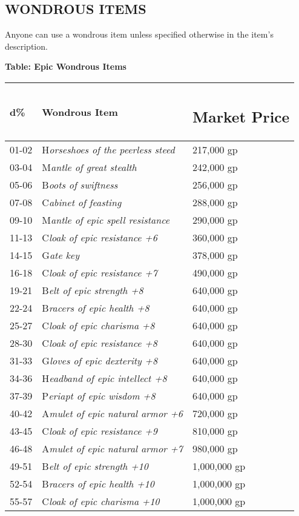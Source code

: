\documentclass{article}
\begin{document}
\vspace{12pt}
\subsection*{{\LARGE{}WONDROUS ITEMS }}

Anyone can use a wondrous item unless specified otherwise in the item's description. 

\vspace{12pt}
\textbf{Table: Epic Wondrous Items }

\begin{tabular}{|>{\raggedright}p{28pt}|>{\raggedright}p{135pt}|>{\raggedright}p{55pt}|}
\hline
d\textbf{\%} & W\textbf{ondrous Item } & \subsection*{M\textbf{arket Price }}\tabularnewline
\hline
01-02 & H\textit{orseshoes of the peerless steed } & 217,000 gp \tabularnewline
\hline
03-04 & M\textit{antle of great stealth } & 242,000 gp \tabularnewline
\hline
05-06 & B\textit{oots of swiftness } & 256,000 gp \tabularnewline
\hline
07-08 & C\textit{abinet of feasting } & 288,000 gp \tabularnewline
\hline
09-10 & M\textit{antle of epic spell resistance } & 290,000 gp \tabularnewline
\hline
11-13 & C\textit{loak of epic resistance +6 } & 360,000 gp \tabularnewline
\hline
14-15 & G\textit{ate key } & 378,000 gp \tabularnewline
\hline
16-18 & C\textit{loak of epic resistance +7 } & 490,000 gp \tabularnewline
\hline
19-21 & B\textit{elt of epic strength +8 } & 640,000 gp \tabularnewline
\hline
22-24 & B\textit{racers of epic health +8 } & 640,000 gp \tabularnewline
\hline
25-27 & C\textit{loak of epic charisma +8 } & 640,000 gp \tabularnewline
\hline
28-30 & C\textit{loak of epic resistance +8 } & 640,000 gp \tabularnewline
\hline
31-33 & G\textit{loves of epic dexterity +8 } & 640,000 gp \tabularnewline
\hline
34-36 & H\textit{eadband of epic intellect +8 } & 640,000 gp \tabularnewline
\hline
37-39 & P\textit{eriapt of epic wisdom +8 } & 640,000 gp \tabularnewline
\hline
40-42 & A\textit{mulet of epic natural armor +6 } & 720,000 gp \tabularnewline
\hline
43-45 & C\textit{loak of epic resistance +9 } & 810,000 gp \tabularnewline
\hline
46-48 & A\textit{mulet of epic natural armor +7 } & 980,000 gp \tabularnewline
\hline
49-51 & B\textit{elt of epic strength +10 } & 1,000,000 gp \tabularnewline
\hline
52-54 & B\textit{racers of epic health +10 } & 1,000,000 gp \tabularnewline
\hline
55-57 & C\textit{loak of epic charisma +10 } & 1,000,000 gp \tabularnewline

\end{tabular}
\end{document}
